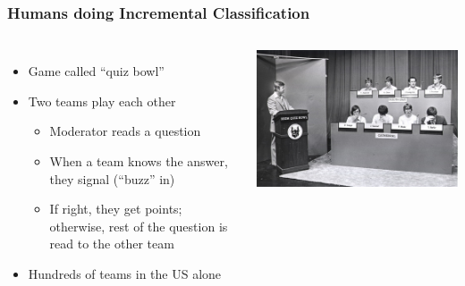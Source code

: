 \documentclass[compress]{beamer}
\begin{document}
\begin{frame}
	\frametitle{Humans doing Incremental Classification}
	\begin{columns}

	\begin{itemize}
		\item Game called ``quiz bowl''
		\item Two teams play each other
		\begin{itemize}
			\item Moderator reads a question
			\item When a team knows the answer, they signal (``buzz'' in)
			\item If right, they get points; otherwise, rest of the question is read to the other team
		\end{itemize}
		\item Hundreds of teams in the US alone
	\end{itemize}

	\includegraphics{qb/quizbowl}

	\end{columns}

\end{frame}
\end{document}

